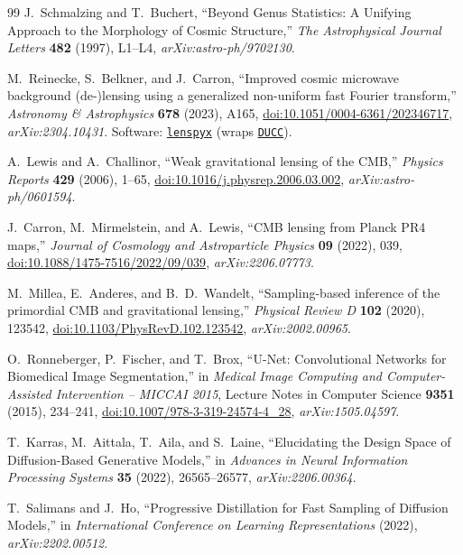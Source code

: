 \documentclass[11pt]{article}
\theoremstyle{definition}
\begin{document}
\begin{thebibliography}{99}
J.~Schmalzing and T.~Buchert,
``Beyond Genus Statistics: A Unifying Approach to the Morphology of Cosmic Structure,''
\emph{The Astrophysical Journal Letters} \textbf{482} (1997), L1--L4,
\emph{arXiv:astro-ph/9702130}.

M.~Reinecke, S.~Belkner, and J.~Carron,
``Improved cosmic microwave background (de-)lensing using a generalized
non-uniform fast Fourier transform,''
\emph{Astronomy \& Astrophysics} \textbf{678} (2023), A165,
\href{https://doi.org/10.1051/0004-6361/202346717}{doi:10.1051/0004-6361/202346717},
\emph{arXiv:2304.10431}.
Software: \href{https://github.com/carronj/lenspyx}{\texttt{lenspyx}} (wraps
\href{https://gitlab.mpcdf.mpg.de/mtr/ducc}{\texttt{DUCC}}).

A.~Lewis and A.~Challinor,
``Weak gravitational lensing of the CMB,''
\emph{Physics Reports} \textbf{429} (2006), 1--65,
\href{https://doi.org/10.1016/j.physrep.2006.03.002}{doi:10.1016/j.physrep.2006.03.002},
\emph{arXiv:astro-ph/0601594}.

J.~Carron, M.~Mirmelstein, and A.~Lewis,
``CMB lensing from Planck PR4 maps,''
\emph{Journal of Cosmology and Astroparticle Physics} \textbf{09} (2022), 039,
\href{https://doi.org/10.1088/1475-7516/2022/09/039}{doi:10.1088/1475-7516/2022/09/039},
\emph{arXiv:2206.07773}.

M.~Millea, E.~Anderes, and B.~D.~Wandelt,
``Sampling-based inference of the primordial CMB and gravitational lensing,''
\emph{Physical Review D} \textbf{102} (2020), 123542,
\href{https://doi.org/10.1103/PhysRevD.102.123542}{doi:10.1103/PhysRevD.102.123542},
\emph{arXiv:2002.00965}.

O.~Ronneberger, P.~Fischer, and T.~Brox,
``U-Net: Convolutional Networks for Biomedical Image Segmentation,''
in \emph{Medical Image Computing and Computer-Assisted Intervention -- MICCAI 2015},
Lecture Notes in Computer Science \textbf{9351} (2015), 234--241,
\href{https://doi.org/10.1007/978-3-319-24574-4_28}{doi:10.1007/978-3-319-24574-4\_28},
\emph{arXiv:1505.04597}.

T.~Karras, M.~Aittala, T.~Aila, and S.~Laine,
``Elucidating the Design Space of Diffusion-Based Generative Models,''
in \emph{Advances in Neural Information Processing Systems} \textbf{35} (2022), 26565--26577,
\emph{arXiv:2206.00364}.

T.~Salimans and J.~Ho,
``Progressive Distillation for Fast Sampling of Diffusion Models,''
in \emph{International Conference on Learning Representations} (2022),
\emph{arXiv:2202.00512}.


\end{thebibliography}
\end{document}
